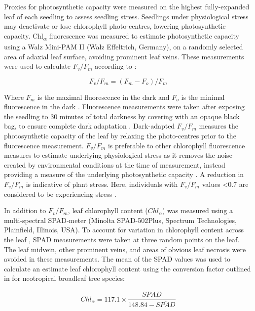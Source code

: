 \documentclass[a4paper, 11pt]{article}
\begin{document}
Proxies for photosynthetic capacity were measured on the highest fully-expanded leaf of each seedling to assess seedling stress. Seedlings under physiological stress may deactivate or lose chlorophyll photo-centres, lowering photosynthetic capacity. Chl\textsubscript{$\alpha$} fluorescence was measured to estimate photosynthetic capacity using a Walz Mini-PAM II (Walz Effeltrich, Germany), on a randomly selected area of adaxial leaf surface, avoiding prominent leaf veins. These measurements were used to calculate $F_v/F_m$ according to \citet{Genty1989}:

\begin{equation} \label{eq:fvfm}
F_v/F_m = (F_m - F_o)/F_m
\end{equation}

Where $F_m$ is the maximal fluorescence in the dark and $F_o$ is the minimal fluorescence in the dark \citep{Maxwell2000}. Fluorescence measurements were taken after exposing the seedling to 30 minutes of total darkness by covering with an opaque black bag, to ensure complete dark adaptation \citep{Campbell2007}. Dark-adapted $F_v/F_m$ measures the photosynthetic capacity of the leaf by relaxing the photo-centres prior to the fluorescence measurement. $F_v/F_m$ is preferable to other chlorophyll fluorescence measures to estimate underlying physiological stress as it removes the noise created by environmental conditions at the time of measurement, instead providing a measure of the underlying photosynthetic capacity \citep{Baker2008}. A reduction in $F_v/F_m$ is indicative of plant stress. Here, individuals with $F_v/F_m$ values \textless{}0.7 are considered to be experiencing stress \citep{Maxwell2000}. 

In addition to $F_v/F_m$, leaf chlorophyll content ($Chl_\alpha$) was measured using a multi-spectral SPAD-meter (Minolta SPAD-502Plus, Spectrum Technologies, Plainfield, Illinois, USA). To account for variation in chlorophyll content across the leaf \citep{Serrano2008}, SPAD measurements were taken at three random points on the leaf. The leaf midvein, other prominent veins, and areas of obvious leaf necrosis were avoided in these measurements. The mean of the SPAD values was used to calculate an estimate leaf chlorophyll content using the conversion factor outlined in \citet{Coste2010} for neotropical broadleaf tree species:

\begin{equation} \label{eq:chl-spad}
Chl_\alpha = 117.1 \times \frac{\overline{SPAD}}{148.84 - \overline{SPAD}}
\end{equation}
\end{document}

